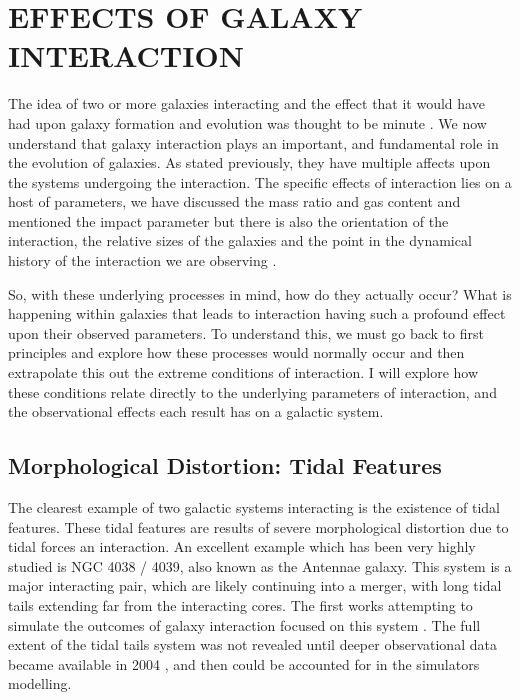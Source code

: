 \section{EFFECTS OF GALAXY INTERACTION}
The idea of two or more galaxies interacting and the effect that it would have had upon galaxy formation and evolution was thought to be minute \citep{Found this info in Chapter 8 of Binnie and Tremaine. Need to find a better source!}. We now understand that galaxy interaction plays an important, and fundamental role in the evolution of galaxies. As stated previously, they have multiple affects upon the systems undergoing the interaction. The specific effects of interaction lies on a host of parameters, we have discussed the mass ratio and gas content and mentioned the impact parameter but there is also the orientation of the interaction, the relative sizes of the galaxies and the point in the dynamical history of the interaction we are observing \citep{Some review paper, perhaps that states that these parameters are important}.

So, with these underlying processes in mind, how do they actually occur? What is happening within galaxies that leads to interaction having such a profound effect upon their observed parameters. To understand this, we must go back to first principles and explore how these processes would normally occur and then extrapolate this out the extreme conditions of interaction. I will explore how these conditions relate directly to the underlying parameters of interaction, and the observational effects each result has on a galactic system.

\subsection{Morphological Distortion: Tidal Features}
\noindent The clearest example of two galactic systems interacting is the existence of tidal features. These tidal features are results of severe morphological distortion due to tidal forces an interaction. An excellent example which has been very highly studied is NGC 4038 / 4039, also known as the Antennae galaxy. This system is a major interacting pair, which are likely continuing into a merger, with long tidal tails extending far from the interacting cores. The first works attempting to simulate the outcomes of galaxy interaction focused on this system \citep{Works like TandT which looked at this}. The full extent of the tidal tails system was not revealed until deeper observational data became available in 2004 \citep{Citation from BandM}, and then could be accounted for in the simulators modelling.

